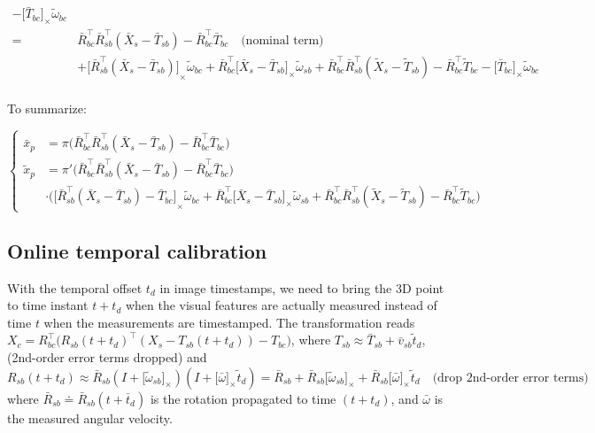 \documentclass[letter,10pt]{article}
\newcommand{\asym}[1]{{\lbrack #1\rbrack}_\times{}}
\begin{document}
\begin{equation}
\begin{aligned}
 - \asym{\bar T_{bc}}\tilde \omega_{bc}  \\
=& \bar R_{bc}^\top \bar R_{sb}^\top (\bar X_s - \bar T_{sb}) - \bar R_{bc}^\top \bar T_{bc} \quad\text{(nominal term)}\\
&+ \asym{\bar R_{sb}^\top (\bar X_s - \bar T_{sb})}\tilde \omega_{bc} 
+ \bar R_{bc}^\top \asym{\bar X_s - \bar T_{sb}}\tilde \omega_{sb}
 + \bar R_{bc}^\top\bar R_{sb}^\top (\tilde X_s - \tilde T_{sb}) 
 - \bar R_{bc}^\top \tilde T_{bc} - \asym{\bar T_{bc}} \tilde \omega_{bc} \\
\end{aligned}
\end{equation}

To summarize:

\begin{equation}
\begin{cases}
\bar x_p &= \pi\big(\bar R_{bc}^\top \bar R_{sb}^\top (\bar X_s - \bar T_{sb}) - \bar R_{bc}^\top \bar T_{bc}\big) \\
\tilde x_p &= \pi'\big(\bar R_{bc}^\top \bar R_{sb}^\top (\bar X_s - \bar T_{sb}) - \bar R_{bc}^\top \bar T_{bc}\big) \\
    &\cdot 
    
    \big( 
    \asym{\bar R_{sb}^\top (\bar X_s - \bar T_{sb}) - \bar T_{bc}}\tilde \omega_{bc} 
+ \bar R_{bc}^\top \asym{\bar X_s - \bar T_{sb}}\tilde \omega_{sb}
+ \bar R_{bc}^\top\bar R_{sb}^\top (\tilde X_s - \tilde T_{sb}) 
- \bar R_{bc}^\top \tilde T_{bc}
    \big)
\end{cases}
\label{eq-msckf-gsb}
\end{equation}

\subsection{Online temporal calibration}

With the temporal offset $t_d$ in image timestamps, we need to bring the 3D point to time instant $t+t_d$ when the visual features are actually measured instead of time $t$ when the measurements are timestamped. The transformation reads $X_c = R_{bc}^\top\big(R_{sb}(t+t_d)^\top (X_s - T_{sb}(t+t_d)) - T_{bc}\big)$, where $T_{sb}\approx \bar T_{sb} + \bar v_{sb} \tilde t_d$,(2nd-order error terms dropped) and
$$
R_{sb}(t+t_d) \approx \bar R_{sb}(I+\asym{\tilde \omega_{sb}})(I + \asym{\bar\omega}\tilde t_d)=\bar R_{sb} + \bar R_{sb}\asym{\tilde \omega_{sb}} + \bar R_{sb}\asym{\bar\omega} \tilde t_d \quad\text{(drop 2nd-order error terms)}
$$
where $\bar R_{sb}\doteq \bar R_{sb}(t+\bar t_d)$ is the rotation propagated to time $(t+t_d)$, and $\bar \omega$ is the measured angular velocity.
\end{document}
